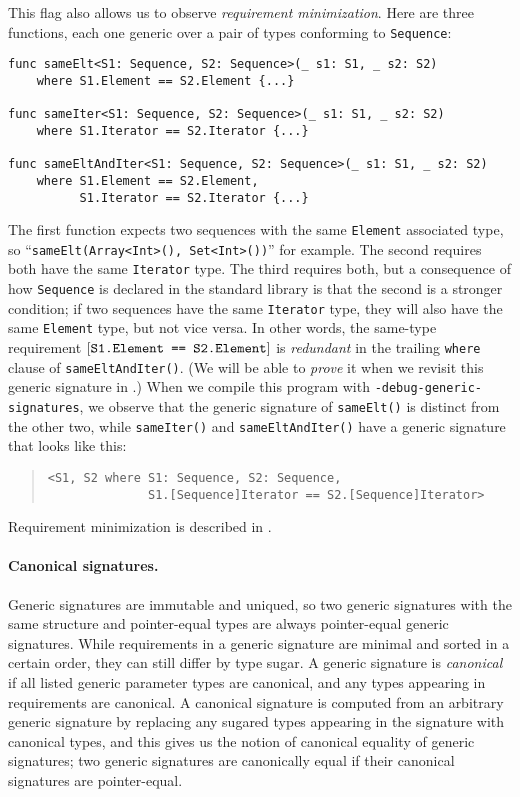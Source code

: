 \documentclass[../generics]{subfiles}
\begin{document}
This flag also allows us to observe \emph{requirement minimization}. Here are three functions, each one generic over a pair of types conforming to \texttt{Sequence}:
\begin{Verbatim}
func sameElt<S1: Sequence, S2: Sequence>(_ s1: S1, _ s2: S2)
    where S1.Element == S2.Element {...}

func sameIter<S1: Sequence, S2: Sequence>(_ s1: S1, _ s2: S2)
    where S1.Iterator == S2.Iterator {...}

func sameEltAndIter<S1: Sequence, S2: Sequence>(_ s1: S1, _ s2: S2)
    where S1.Element == S2.Element,
          S1.Iterator == S2.Iterator {...}
\end{Verbatim}
The first function expects two sequences with the same \texttt{Element} associated type, so ``\verb|sameElt(Array<Int>(), Set<Int>())|'' for example. The second requires both have the same \texttt{Iterator} type. The third requires both, but a consequence of how \texttt{Sequence} is declared in the standard library is that the second is a stronger condition; if two sequences have the same \texttt{Iterator} type, they will also have the same \texttt{Element} type, but not vice versa. In other words, the same-type requirement $[\texttt{S1.Element == S2.Element}]$ is \emph{redundant} in the trailing \texttt{where} clause of \texttt{sameEltAndIter()}. (We will be able to \emph{prove} it when we revisit this generic signature in .) When we compile this program with \texttt{-debug-generic-signatures}, we observe that the generic signature of \texttt{sameElt()} is distinct from the other two, while \texttt{sameIter()} and \texttt{sameEltAndIter()} have a generic signature that looks like this:
\begin{quote}
\begin{verbatim}
<S1, S2 where S1: Sequence, S2: Sequence,
              S1.[Sequence]Iterator == S2.[Sequence]Iterator>
\end{verbatim}
\end{quote}
Requirement minimization is described in .

\paragraph{Canonical signatures.}
Generic signatures are immutable and uniqued, so two generic signatures with the same structure and pointer-equal types are always pointer-equal generic signatures. While requirements in a generic signature are minimal and sorted in a certain order, they can still differ by type sugar. A generic signature is \emph{canonical} if all listed generic parameter types are canonical, and any types appearing in requirements are canonical. A canonical signature is computed from an arbitrary generic signature by replacing any sugared types appearing in the signature with canonical types, and this gives us the notion of canonical equality of generic signatures; two generic signatures are canonically equal if their canonical signatures are pointer-equal.
\end{document}
